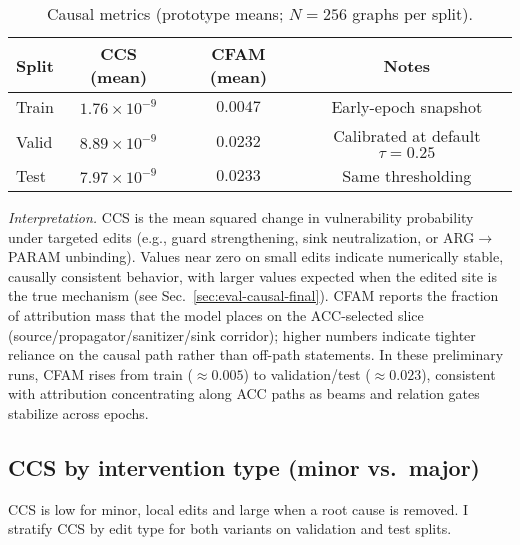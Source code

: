\documentclass{buthesis}
\begin{document}
\begin{table}[H]
\centering
\small
\setlength{\tabcolsep}{8pt}
\renewcommand{\arraystretch}{1.10}
\caption{Causal metrics (prototype means; $N{=}256$ graphs per split).}
\label{tab:results-causal-proto}
\begin{tabular}{lccc}
\toprule
\textbf{Split} & \textbf{CCS (mean)} & \textbf{CFAM (mean)} & \textbf{Notes} \\
\midrule
Train & $1.76\!\times\!10^{-9}$ & $0.0047$ & Early-epoch snapshot \\
Valid & $8.89\!\times\!10^{-9}$ & $0.0232$ & Calibrated at default $\tau{=}0.25$ \\
Test  & $7.97\!\times\!10^{-9}$ & $0.0233$ & Same thresholding \\
\bottomrule
\end{tabular}
\end{table}

\noindent\textit{Interpretation.} CCS is the mean squared change in vulnerability probability under targeted edits (e.g., guard strengthening, sink neutralization, or ARG$\!\to$PARAM unbinding). Values near zero on small edits indicate numerically stable, causally consistent behavior, with larger values expected when the edited site is the true mechanism (see Sec.~\ref{sec:eval-causal-final}). CFAM reports the fraction of attribution mass that the model places on the ACC-selected slice (source/propagator/sanitizer/sink corridor); higher numbers indicate tighter reliance on the causal path rather than off-path statements. In these preliminary runs, CFAM rises from train ($\approx0.005$) to validation/test ($\approx0.023$), consistent with attribution concentrating along ACC paths as beams and relation gates stabilize across epochs.






\subsection{CCS by intervention type (minor vs.\ major)}
\label{subsec:ccs-types}

CCS is low for minor, local edits and large when a root cause is removed. I stratify CCS by edit type for both variants on validation and test splits.
\end{document}
